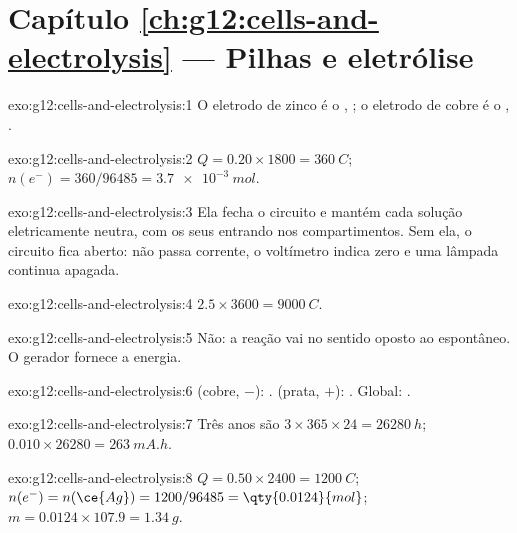 \section*{Capítulo \ref{ch:g12:cells-and-electrolysis} --- Pilhas e eletrólise}

\begin{solution}{exo:g12:cells-and-electrolysis:1}
O eletrodo de zinco é o , ; o eletrodo de
cobre é o , .
\end{solution}

\begin{solution}{exo:g12:cells-and-electrolysis:2}
$Q = 0.20 \times 1800 = \qty{360}{C}$; $n(e^-) = 360/96485 =
\qty{3.7e-3}{mol}$.
\end{solution}

\begin{solution}{exo:g12:cells-and-electrolysis:3}
Ela fecha o circuito e mantém cada solução eletricamente neutra, com os
seus  entrando nos compartimentos. Sem ela, o circuito fica aberto:
não passa corrente, o voltímetro indica zero e uma lâmpada continua
apagada.
\end{solution}

\begin{solution}{exo:g12:cells-and-electrolysis:4}
$2.5 \times 3600 = \qty{9000}{C}$.
\end{solution}

\begin{solution}{exo:g12:cells-and-electrolysis:5}
Não: a reação vai no sentido oposto ao espontâneo. O gerador fornece a
energia.
\end{solution}

\begin{solution}{exo:g12:cells-and-electrolysis:6}
 (cobre, $-$): .  (prata, $+$):
. Global: .
\end{solution}

\begin{solution}{exo:g12:cells-and-electrolysis:7}
Três anos são $3 \times 365 \times 24 = \qty{26280}{h}$;
$0.010 \times 26280 = \qty{263}{mA.h}$.
\end{solution}

\begin{solution}{exo:g12:cells-and-electrolysis:8}
$Q = 0.50 \times 2400 = \qty{1200}{C}$; $n(e^-) = n(\ce{Ag}) =
1200/96485 = \qty{0.0124}{mol}$; $m = 0.0124 \times 107.9 =
\qty{1.34}{g}$.
\end{solution}

